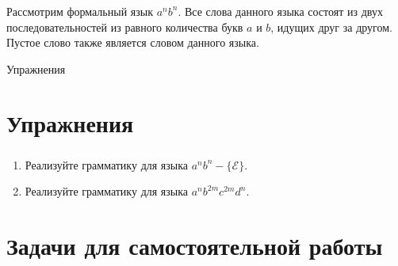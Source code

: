 \begin{frame}

	\frametitle{\insertsection}
	\framesubtitle{\insertsubsection}
	
	Рассмотрим формальный язык \(a^nb^n \). Все слова данного языка состоят из двух последовательностей из равного количества букв \(a\) и \(b\),
	идущих друг за другом. Пустое слово также является словом данного языка.
	

\end{frame}

\begin{frame}

	\begin{center}
		\Huge Упражнения
	\end{center}

\end{frame}


\section{Упражнения}

\begin{frame}

	\frametitle{\insertsection}

	\begin{enumerate}
		\item Реализуйте грамматику для языка \(a^nb^n - \{\mathcal{E} \}\).
		\item Реализуйте грамматику для языка \(a^nb^{2m}c^{2m}d^n \).
	\end{enumerate}
	

\end{frame}

\section{Задачи для самостоятельной работы}

\begin{frame}

	\begin{center}
		\Huge \insertsection
	\end{center}

\end{frame}

